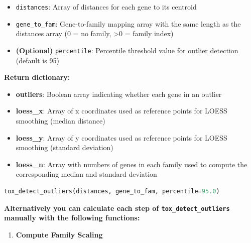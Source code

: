 \begin{enumerate}
          \begin{itemize}
            \item \texttt{distances}: Array of distances for each gene to its centroid
                  
            \item \texttt{gene\_to\_fam}: Gene-to-family mapping array with the same
                  length as the distances array (0 = no family, \textgreater 0 = family index)
                  
            \item \textbf{(Optional)} \texttt{percentile}: Percentile threshold
                  value for outlier detection (default is 95)
          \end{itemize}
          
          \textbf{Return dictionary:}
          \begin{itemize}
            \item \textbf{outliers}: Boolean array indicating whether each gene in an
                  outlier
                  
            \item \textbf{loess\_x}: Array of x coordinates used as reference points
                  for LOESS smoothing (median distance)
                  
            \item \textbf{loess\_y}: Array of y coordinates used as reference points
                  for LOESS smoothing (standard deviation)
                  
            \item \textbf{loess\_n}: Array with numbers of genes in each family used
                  to compute the corresponding median and standard deviation
          \end{itemize}
          
          \begin{lstlisting}[language=Python, caption={Python Gene Outlier Calculation}]
tox_detect_outliers(distances, gene_to_fam, percentile=95.0)
          \end{lstlisting}
          
          \textbf{Alternatively you can calculate each step of \texttt{tox\_detect\_outliers}
          manually with the following functions:}
          \begin{enumerate}
            \item \textbf{Compute Family Scaling}
                  

\end{enumerate}
\end{enumerate}
